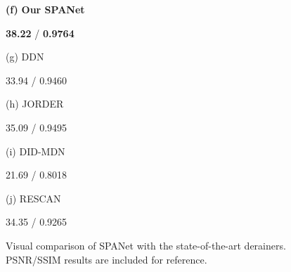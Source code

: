 \documentclass[10pt,twocolumn,letterpaper]{article}
\begin{document}
\begin{figure*}
\begin{minipage}[t]{0.17\linewidth}
\centerline{\footnotesize \textbf{(f)} \textbf{Our SPANet}}
\centerline{\footnotesize \textbf{38.22} / \textbf{0.9764}}
\end{minipage}
\centering
\begin{minipage}[t]{0.17\textwidth}
\centerline{\footnotesize (g) DDN~\cite{fu:cvpe:2017:ddn}}
\centerline{\footnotesize 33.94 / 0.9460 }
\end{minipage}
\centering
\begin{minipage}[t]{0.17\textwidth}
\centerline{\footnotesize (h) JORDER~\cite{yang:cvpr:2017:j}}
\centerline{\footnotesize 35.09 / 0.9495}
\end{minipage}
\centering
\begin{minipage}[t]{0.17\textwidth}
\centerline{\footnotesize (i) DID-MDN~\cite{zhang:cvpr:2018:did}}
\centerline{\footnotesize 21.69 / 0.8018}
\end{minipage}
\begin{minipage}[t]{0.17\textwidth}
\centerline{\footnotesize (j) RESCAN~\cite{li:eccv:2018:rsecan}}
\centerline{\footnotesize 34.35 / 0.9265}
\end{minipage}
\vspace{1.5mm}
\caption{Visual comparison of SPANet with the state-of-the-art derainers. PSNR/SSIM results are included for reference.}
\label{fig:bench}
\vspace{-4mm}
\end{figure*}
\end{document}
